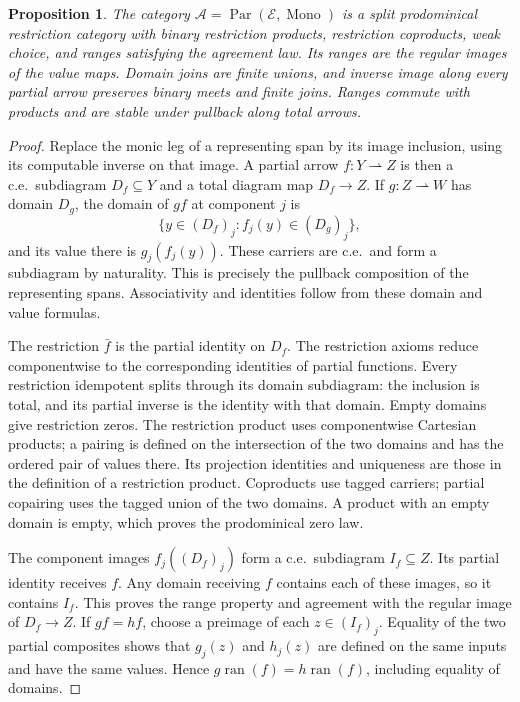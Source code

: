 \documentclass[11pt]{article}
\newtheorem{proposition}[theorem]{Proposition}
\newcommand{\ran}{\operatorname{ran}}
\begin{document}
\begin{proposition}\label{prop:fork-structure}
The category $\mathcal A=\operatorname{Par}(\mathcal E,
\operatorname{Mono})$ is a split prodominical restriction category
with binary restriction products, restriction coproducts, weak
choice, and ranges satisfying the agreement law. Its ranges are
the regular images of the value maps. Domain joins are finite
unions, and inverse image along every partial arrow preserves
binary meets and finite joins. Ranges commute with products and
are stable under pullback along total arrows.
\end{proposition}
\begin{proof}
Replace the monic leg of a representing span by its image
inclusion, using its computable inverse on that image. A partial
arrow $f:Y\rightharpoonup Z$ is then a c.e.\ subdiagram
$D_f\subseteq Y$ and a total diagram map $D_f\to Z$.
If $g:Z\rightharpoonup W$ has domain $D_g$, the domain of $gf$
at component $j$ is
\[
 \{y\in(D_f)_j:f_j(y)\in(D_g)_j\},
\]
and its value there is $g_j(f_j(y))$. These carriers are c.e.\
and form a subdiagram by naturality. This is precisely the
pullback composition of the representing spans. Associativity
and identities follow from these domain and value formulas.

The restriction $\bar f$ is the partial identity on $D_f$.
The restriction axioms reduce componentwise to the corresponding
identities of partial functions. Every restriction idempotent
splits through its domain subdiagram: the inclusion is total,
and its partial inverse is the identity with that domain.
Empty domains give restriction zeros. The restriction product
uses componentwise Cartesian products; a pairing is defined on
the intersection of the two domains and has the ordered pair
of values there. Its projection identities and uniqueness are
those in the definition of a restriction product. Coproducts
use tagged carriers; partial copairing uses the tagged union
of the two domains. A product with an empty domain is empty,
which proves the prodominical zero law.

The component images $f_j((D_f)_j)$ form a c.e.\ subdiagram
$I_f\subseteq Z$. Its partial identity receives $f$. Any domain
receiving $f$ contains each of these images, so it contains $I_f$.
This proves the range property and agreement with the regular
image of $D_f\to Z$. If $gf=hf$, choose a preimage of each
$z\in(I_f)_j$. Equality of the two partial composites shows
that $g_j(z)$ and $h_j(z)$ are defined on the same inputs and
have the same values. Hence $g\ran(f)=h\ran(f)$, including
equality of domains.


\end{proof}
\end{document}
